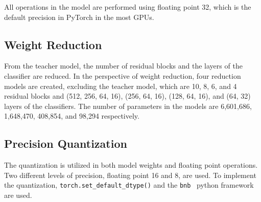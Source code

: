 All operations in the model are performed using floating point 32,
which is the default precision in PyTorch \cite{paszke2019pytorch}
in the most GPUs.

\subsection{Weight Reduction}
\label{sec:method:weight_reduction}

From the teacher model,
the number of residual blocks and the layers of the classifier are reduced.
In the perspective of weight reduction,
four reduction models are created, excluding the teacher model,
which are 10, 8, 6, and 4 residual blocks
and (512, 256, 64, 16), (256, 64, 16), (128, 64, 16), and (64, 32) layers of the classifiers.
The number of parameters in the models are 6,601,686, 1,648,470, 408,854, and 98,294 respectively.

\subsection{Precision Quantization}
\label{sec:method:precision_quantization}

The quantization is utilized in both model weights and floating point operations.
Two different levels of precision, floating point 16 and 8, are used.
To implement the quantization,
\texttt{torch.set\_default\_dtype()} and the \texttt{bnb}~\cite{bitsandbytes} python framework
are used.